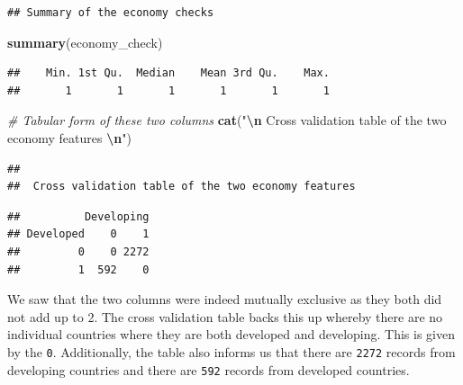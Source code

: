 \documentclass[
  10pt,
]{article}
\newenvironment{Shaded}{\begin{snugshade}}{\end{snugshade}}
\newcommand{\AttributeTok}[1]{\textcolor[rgb]{0.13,0.29,0.53}{#1}}
\newcommand{\CommentTok}[1]{\textcolor[rgb]{0.56,0.35,0.01}{\textit{#1}}}
\newcommand{\FunctionTok}[1]{\textcolor[rgb]{0.13,0.29,0.53}{\textbf{#1}}}
\newcommand{\NormalTok}[1]{#1}
\newcommand{\SpecialCharTok}[1]{\textcolor[rgb]{0.81,0.36,0.00}{\textbf{#1}}}
\newcommand{\StringTok}[1]{\textcolor[rgb]{0.31,0.60,0.02}{#1}}
\begin{document}
\begin{verbatim}
## Summary of the economy checks
\end{verbatim}

\begin{Shaded}
\begin{Highlighting}[]
\FunctionTok{summary}\NormalTok{(economy\_check)}
\end{Highlighting}
\end{Shaded}

\begin{verbatim}
##    Min. 1st Qu.  Median    Mean 3rd Qu.    Max. 
##       1       1       1       1       1       1
\end{verbatim}

\begin{Shaded}
\begin{Highlighting}[]
\CommentTok{\# Tabular form of these two columns}
\FunctionTok{cat}\NormalTok{(}\StringTok{"}\SpecialCharTok{\textbackslash{}n}\StringTok{ Cross validation table of the two economy features }\SpecialCharTok{\textbackslash{}n}\StringTok{"}\NormalTok{)}
\end{Highlighting}
\end{Shaded}

\begin{verbatim}
## 
##  Cross validation table of the two economy features
\end{verbatim}

\begin{Shaded}
\end{Shaded}

\begin{verbatim}
##          Developing
## Developed    0    1
##         0    0 2272
##         1  592    0
\end{verbatim}

We saw that the two columns were indeed mutually exclusive as they both
did not add up to 2. The cross validation table backs this up whereby
there are no individual countries where they are both developed and
developing. This is given by the \texttt{0}. Additionally, the table
also informs us that there are \texttt{2272} records from developing
countries and there are \texttt{592} records from developed countries.\\
\end{document}
